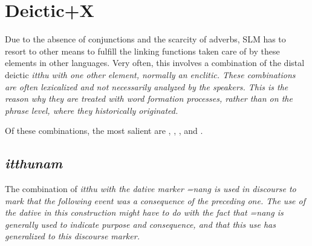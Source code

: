 \section{Deictic+X}\label{sec:wofo:Deictic+X}
Due to the absence of conjunctions and the scarcity of adverbs, SLM has to resort to other means to fulfill the linking functions  taken care of by these elements in other languages. Very often, this involves a combination of the distal deictic \em itthu \em with one other element, normally an enclitic. These combinations are often lexicalized and not necessarily analyzed by the speakers. This is the reason why they are treated with  word formation processes, rather than on the phrase level, where they historically originated.


Of these combinations, the most salient are , , , and  .

\subsection{\em itthunam\em}\label{sec:wofo:itthunam}

The combination of \em itthu \em with the dative marker \em =nang \em is used in discourse to mark that the following event was a consequence of the preceding one. The use of the dative in this construction might have to do with the fact that \em =nang \em is generally used to indicate purpose  and consequence, and that this use has generalized to this discourse marker.



